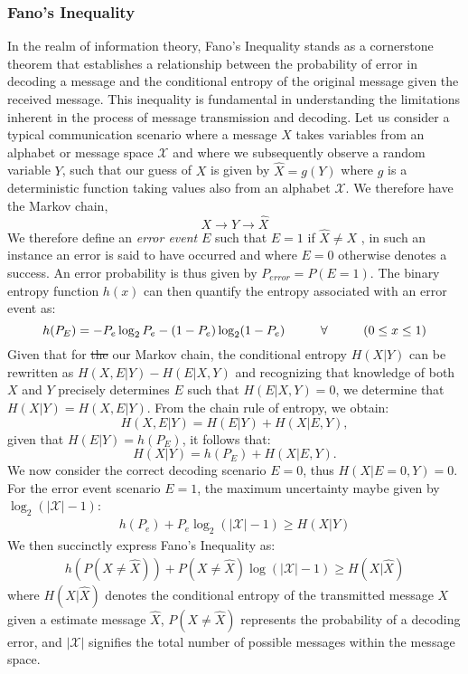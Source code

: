 \documentclass[12pt]{article}
\begin{document}
		\subsubsection{Fano's Inequality}
		In the realm of information theory, Fano's Inequality stands as a cornerstone theorem that establishes a relationship between the probability of error in decoding a message and the conditional entropy of the original message given the received message. This inequality is fundamental in understanding the limitations inherent in the process of message transmission and decoding.  Let us consider a typical communication scenario where a message $X$  takes variables from an alphabet  or message space $\mathcal{X}$ and where we subsequently observe  a random variable $Y$, such that our guess of $X$ is given by $\hat{X} = g(Y)$ where $g$ is a deterministic function taking values also from an alphabet  $\mathcal{X}$. We therefore have the Markov chain,
		\begin{equation}
			X \rightarrow Y \rightarrow \hat{X}
		\end{equation}
		We therefore define an \emph{error event} \(E\) such that \(E = 1\) if \( \hat{X} \neq X\) , in such an instance an error is said to have occurred  and where \(E = 0\) otherwise  denotes a success. An error probability is thus given by \(P_{error} = P(E = 1)\). The {binary entropy} function $h(x) $ can then quantify the entropy associated with an error event as:
		\begin{equation}
			h(P_E) = -P_e \log_2 P_e - (1 - P_e) \log_2 (1 - P_e) \hspace{1.0cm} \forall \hspace{1.0cm} (0 \leq x \leq 1)
		\end{equation}
		Given that for \st{the} our Markov chain, the conditional entropy \(H(X|Y)\) can be rewritten as \(H(X, E|Y) - H(E|X, Y)\) and recognizing that knowledge of both \(X\) and \(Y\) precisely determines \(E\)  such that \(H(E|X, Y) = 0\), we determine that \(H(X|Y) = H(X, E|Y)\). From the chain rule of entropy, we obtain:
		\begin{equation}
			H(X, E|Y) = H(E|Y) + H(X|E, Y),
		\end{equation}
		given that \(H(E|Y) = h(P_E)\), it follows that:
		\begin{equation}
			H(X|Y) = h(P_E) + H(X|E, Y).
		\end{equation}
		We now consider the correct decoding scenario \(E = 0\), thus \(H(X|E=0, Y) = 0\). For the error event scenario \(E = 1\), the maximum uncertainty maybe given by \(\log_2 (|\mathcal{X}| - 1)\):
		\begin{align*}
			h(P_e) + P_e \log_2 (|\mathcal{X}| - 1)  \geq H(X|Y)  
		\end{align*}
		We then succinctly express Fano's Inequality  as:
		\begin{align*}
			h(P(X \neq \hat{X})) + P(X \neq \hat{X}) \log (|\mathcal{X}| - 1)  \geq H(X | \hat{X})
		\end{align*}
		where \(H(X|\hat{X})\) denotes the conditional entropy of the transmitted message \(X\) given a estimate message \(\hat{X}\), \( P(X \neq \hat{X})\) represents the probability of a decoding error, and \(|\mathcal{X}|\) signifies the total number of possible messages within the message space.
	
\end{document}
